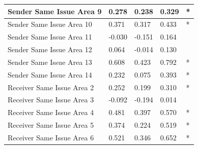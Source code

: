 \documentclass[headsepline=true, abstracton]{scrartcl}
\begin{document}
\begin{table}[htp]
\begin{tabular}{|
>{\columncolor[HTML]{EFEFEF}}l |l|l|l|l|}
Sender Same Issue Area 9                           & 0.278                            & 0.238                               & 0.329                               & *                                    \\ \hline
Sender Same Issue Area 10                          & 0.371                            & 0.317                               & 0.433                               & *                                    \\ \hline
Sender Same Issue Area 11                          & -0.030                           & -0.151                              & 0.164                               &                                      \\ \hline
Sender Same Issue Area 12                          & 0.064                           & -0.014                              & 0.130                               &                                      \\ \hline
Sender Same Issue Area 13                          & 0.608                            & 0.423                               & 0.792                               & *                                    \\ \hline
Sender Same Issue Area 14                          & 0.232                            & 0.075                              & 0.393                               & *                                      \\ \hline
Receiver Same Issue Area 2                         & 0.252                            & 0.199                               & 0.310                               & *                                    \\ \hline
Receiver Same Issue Area 3                         & -0.092                           & -0.194                              & 0.014                              &                                     \\ \hline
Receiver Same Issue Area 4                         & 0.481                            & 0.397                               & 0.570                               & *                                    \\ \hline
Receiver Same Issue Area 5                         & 0.374                            & 0.224                               & 0.519                               & *                                    \\ \hline
Receiver Same Issue Area 6                         & 0.521                            & 0.346                               & 0.652                               & *                                    \\ \hline

\end{tabular}
\end{table}
\end{document}
